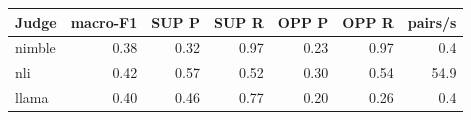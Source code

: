 \begin{tabular}{lrrrrrr}
\toprule
Judge & macro-F1 & SUP P & SUP R & OPP P & OPP R & pairs/s \\
\midrule
nimble & 0.38 & 0.32 & 0.97 & 0.23 & 0.97 & 0.4 \\
nli & 0.42 & 0.57 & 0.52 & 0.30 & 0.54 & 54.9 \\
llama & 0.40 & 0.46 & 0.77 & 0.20 & 0.26 & 0.4 \\
\bottomrule
\end{tabular}